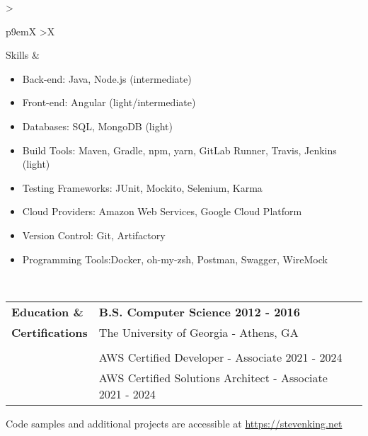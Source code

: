 \documentclass[final]{letter}
\begin{document}
	\begin{tabularx}{\linewidth}{
		>{\raggedright\bf\Large}p{9em}X
		>{\centering}X
	} 
		Skills & \begin{itemize}[topsep=1pt,noitemsep]
			\item[] Back-end: \tab Java, Node.js (intermediate)
			\item[] Front-end: \tab Angular (light/intermediate)
			\item[] Databases: \tab SQL, MongoDB (light)
			\item[] Build Tools: \tab Maven, Gradle, npm, yarn, GitLab Runner, Travis, Jenkins (light)
			\item[] Testing Frameworks: \tab JUnit, Mockito, Selenium, Karma
			\item[] Cloud Providers: \tab Amazon Web Services, Google Cloud Platform
			\item[] Version Control: \tab Git, Artifactory
			\item[] Programming Tools:\tab Docker, oh-my-zsh, Postman, Swagger, WireMock
		\end{itemize}
	\end{tabularx} \\

	\begin{tabularx}{\linewidth} {
		>{\raggedright\bf\Large}p{10em}X
		>{\centering}X
	} 
		Education \& & \large\bf{B.S. Computer Science \hfill 2012 - 2016} \\
		Certifications & The University of Georgia - Athens, GA \\
		& \\
		& AWS Certified Developer - Associate \hfill 2021 - 2024 \\
		& AWS Certified Solutions Architect - Associate \hfill 2021 - 2024
	\end{tabularx}

	\vspace{.5em}

	\begin{center}
		Code samples and additional projects are accessible at \href{https://stevenking.net}{https://stevenking.net}
	\end{center}
\end{document}
